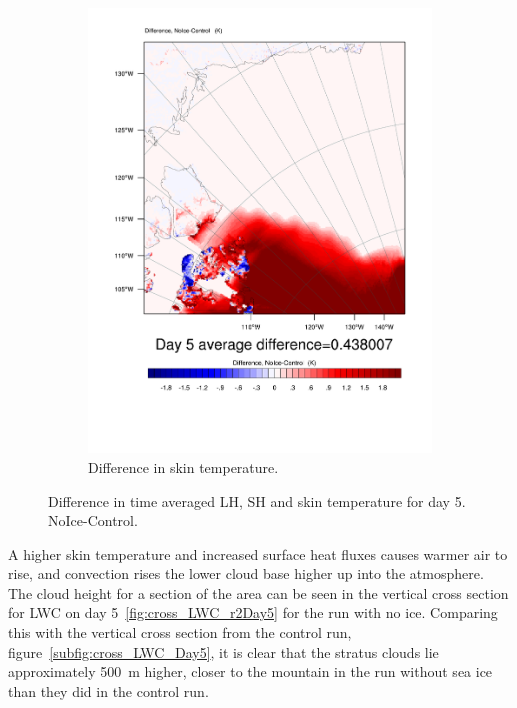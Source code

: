 \begin{figure}
	\begin{subfigure}{0.48\textwidth}
		\includegraphics[width=\textwidth]{results/noice/diff_NoIce_skintemp_Day5.pdf}
		\caption{Difference in skin temperature.}
		\label{subfig:skin_r2Day5}
	\end{subfigure}
	\caption{Difference in time averaged LH, SH and skin temperature for day 5. NoIce-Control.}
	\label{fig:lhshskin_r2Day5}
\end{figure}

A higher skin temperature and increased surface heat fluxes causes warmer air to rise, and convection rises the lower cloud base higher up into the atmosphere. The cloud height for a section of the area can be seen in the vertical cross section for LWC on day 5~\ref{fig:cross_LWC_r2Day5} for the run with no ice. Comparing this with the vertical cross section from the control run, figure~\ref{subfig:cross_LWC_Day5}, it is clear that the stratus clouds lie approximately 500~m higher, closer to the mountain in the run without sea ice than they did in the control run.

